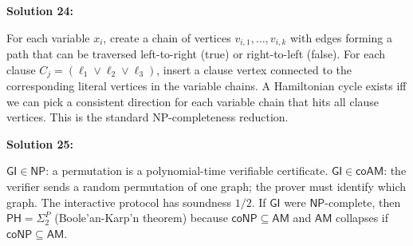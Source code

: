 \documentclass[12pt,a4paper]{exam}
\begin{document}
\vspace{0.5cm}

\textbf{Solution 24:}

For each variable $x_i$, create a chain of vertices $v_{i,1}, \ldots, v_{i,k}$ with edges forming a path that can be traversed left-to-right (true) or right-to-left (false). For each clause $C_j = (\ell_1 \lor \ell_2 \lor \ell_3)$, insert a clause vertex connected to the corresponding literal vertices in the variable chains. A Hamiltonian cycle exists iff we can pick a consistent direction for each variable chain that hits all clause vertices. This is the standard NP-completeness reduction.

\vspace{0.5cm}

\textbf{Solution 25:}

$\mathsf{GI} \in \mathsf{NP}$: a permutation is a polynomial-time verifiable certificate. $\mathsf{GI} \in \mathsf{coAM}$: the verifier sends a random permutation of one graph; the prover must identify which graph. The interactive protocol has soundness $1/2$. If $\mathsf{GI}$ were $\mathsf{NP}$-complete, then $\mathsf{PH} = \Sigma_2^P$ (Boole'an-Karp'n theorem) because $\mathsf{coNP} \subseteq \mathsf{AM}$ and $\mathsf{AM}$ collapses if $\mathsf{coNP} \subseteq \mathsf{AM}$.

\vspace{0.5cm}
\end{document}
